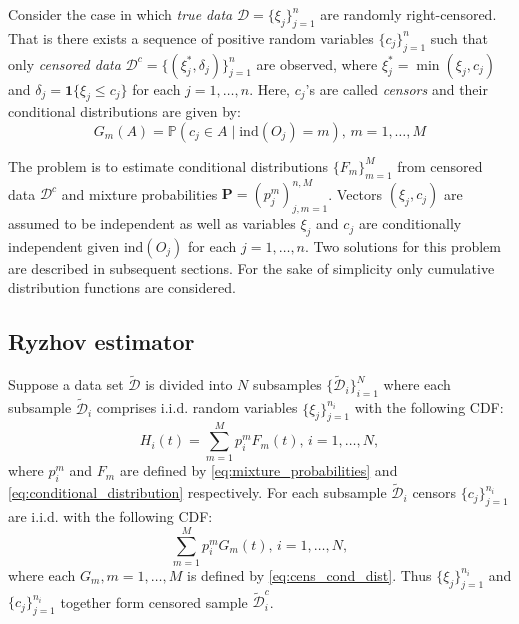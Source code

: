 \documentclass[12pt,reqno,a4paper,oneside]{article}
\theoremstyle{plain}
\theoremstyle{definition}
\theoremstyle{remark}
\begin{document}
Consider the case in which \emph{true data} $\mathcal D = \{\xi _j\}_{j=1}^n$ are randomly right-censored. That is there exists a sequence of positive random variables $\{c_j\}_{j=1}^n$ such that only \emph{censored data} $\mathcal D^c = \{(\xi _j^*, \delta _j)\}_{j=1}^n$ are observed, where $\xi _j^* = \min (\xi _j, c_j)$ and $\delta _j = \mathbf 1\{\xi _j \leq c_j\}$ for each $j=1,\ldots ,n$. Here, $c_j$'s are called \emph{censors} and their conditional distributions are given by:
\begin{equation}
\label{eq:cens_cond_dist}
G_m (A) = \mathbb P(c _j \in A \mid \mathrm{ind}(O_j) = m),\, m=1,\ldots , M
\end{equation} 

The problem is to estimate conditional distributions $\{F_m\}_{m=1}^M$ from censored data $\mathcal D^c$ and mixture probabilities $\mathbf P = (p_j^m)_{j,m=1}^{n,M}$. Vectors $(\xi _j, c _j)$ are assumed to be independent as well as variables $\xi _j$ and $c_j$ are conditionally independent given $\mathrm{ind}(O_j)$ for each $j=1,\ldots ,n$. Two solutions for this problem are described in subsequent sections. For the sake of simplicity only cumulative distribution functions are considered.

\subsection{Ryzhov estimator}
\label{subsec:ryzhov_estimator}
Suppose a data set $\tilde {\mathcal D}$ is divided into $N$ subsamples $\{\tilde{\mathcal D} _i\}_{i=1}^N$ where each subsample $\tilde{\mathcal D}_i$ comprises i.i.d. random variables $\{\xi _{j} \}_{j=1}^{n_i}$ with the following CDF:
\begin{equation}
\label{eq:Ryzhov_mixture_distribution}
H_i(t) = \sum _{m=1}^M p_i^mF_m(t), \, i = 1,\ldots, N,
\end{equation}
where $p_i^m$ and $F_m$ are defined by \eqref{eq:mixture_probabilities} and \eqref{eq:conditional_distribution} respectively. For each subsample $\tilde{\mathcal{D}}_i$ censors $\{c_j\}_{j=1}^{n_i}$ are i.i.d. with the following CDF:
\begin{equation}
\sum _{m=1}^M p_i^mG_m(t), \, i = 1,\ldots, N,
\end{equation}
where each $G_m, m=1,\ldots, M$ is defined by \eqref{eq:cens_cond_dist}. Thus $\{\xi _{j} \}_{j=1}^{n_i}$ and $\{c_j\}_{j=1}^{n_i}$ together form censored sample $\tilde{\mathcal D}_i^c$.
\end{document}
